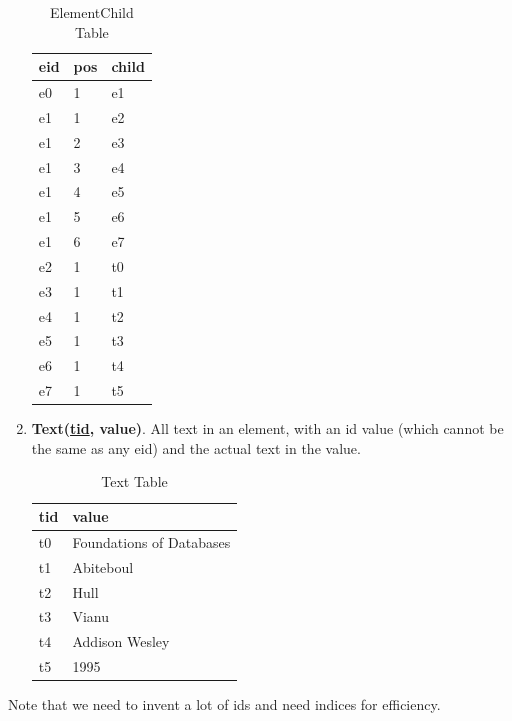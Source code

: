 \documentclass{article}
\begin{document}
\begin{enumerate}
        \begin{table}[H]
          \centering
          \caption{ElementChild Table}
          \begin{tabular}{|l|l|l|}
          \hline
          \textbf{eid} & \textbf{pos} & \textbf{child} \\
          \hline
            e0 & 1 & e1 \\
            e1 & 1 & e2 \\
            e1 & 2 & e3 \\
            e1 & 3 & e4 \\
            e1 & 4 & e5 \\
            e1 & 5 & e6 \\
            e1 & 6 & e7 \\
            e2 & 1 & t0 \\
            e3 & 1 & t1 \\
            e4 & 1 & t2 \\
            e5 & 1 & t3 \\
            e6 & 1 & t4 \\
            e7 & 1 & t5 \\
          \hline
          \end{tabular}
        \end{table}

      \item \textbf{Text(\underline{tid}, value)}. All text in an element, with an id value (which cannot be the same as any eid) and the actual text in the value. 

        \begin{table}[H]
          \centering
          \caption{Text Table}
          \begin{tabular}{|l|l|}
          \hline
          \textbf{tid} & \textbf{value} \\
          \hline
          t0 & Foundations of Databases \\
          t1 & Abiteboul \\
          t2 & Hull \\
          t3 & Vianu \\
          t4 & Addison Wesley \\
          t5 & 1995 \\
          \hline
          \end{tabular}
        \end{table}
    \end{enumerate}
    Note that we need to invent a lot of ids and need indices for efficiency. 
\end{document}
